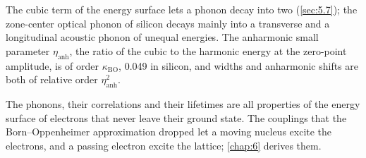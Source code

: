 The cubic term of the energy surface lets a phonon decay into two (\cref{sec:5.7}); the zone-center optical phonon of silicon decays mainly into a transverse and a longitudinal acoustic phonon of unequal energies. The anharmonic small parameter $\eta_{\mathrm{anh}}$, the ratio of the cubic to the harmonic energy at the zero-point amplitude, is of order $\kappa_{\mathrm{BO}}$, 0.049 in silicon, and widths and anharmonic shifts are both of relative order $\eta_{\mathrm{anh}}^2$.

The phonons, their correlations and their lifetimes are all properties of the energy surface of electrons that never leave their ground state. The couplings that the Born--Oppenheimer approximation dropped let a moving nucleus excite the electrons, and a passing electron excite the lattice; \cref{chap:6} derives them.
